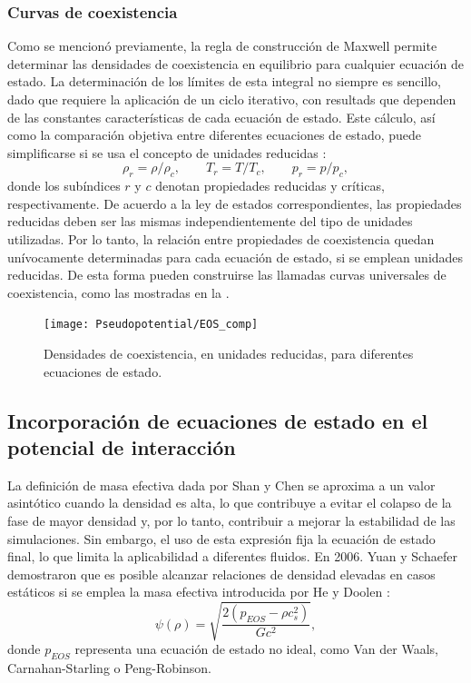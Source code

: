 

\subsubsection*{Curvas de coexistencia}

Como se mencion\'o previamente, la regla de construcci\'on de Maxwell permite determinar las densidades de coexistencia en equilibrio para cualquier ecuaci\'on de estado. La determinaci\'on de los l\'imites de esta integral no siempre es sencillo, dado que requiere la aplicaci\'on de un ciclo iterativo, con resultads que dependen de las constantes caracter\'isticas de cada ecuaci\'on de estado. Este c\'alculo, as\'i como la comparaci\'on objetiva entre diferentes ecuaciones de estado, puede simplificarse si se usa el concepto de unidades reducidas \cite{mcquarrie_molecular_1999}:
\begin{equation}
	\rho_r = \rho / \rho_c, \qquad T_r = T / T_c, \qquad p_r = p / p_c,
\end{equation}
donde los sub\'indices $r$ y $c$ denotan propiedades reducidas y cr\'iticas, respectivamente. De acuerdo a la ley de estados correspondientes, las propiedades reducidas deben ser las mismas independientemente del tipo de unidades utilizadas. Por lo tanto, la relaci\'on entre propiedades de coexistencia quedan un\'ivocamente determinadas para cada ecuaci\'on de estado, si se emplean unidades reducidas. De esta forma pueden construirse las llamadas curvas universales de coexistencia, como las mostradas en la .

\begin{figure}[ht]
	\centering
	\texttt{[image: Pseudopotential/EOS\_comp]}
	\caption{Densidades de coexistencia, en unidades reducidas, para diferentes ecuaciones de estado.}
	\label{fig:EOS}
\end{figure}





\subsection{Incorporaci\'on de ecuaciones de estado en el potencial de interacci\'on}

La definici\'on de masa efectiva dada por Shan y Chen se aproxima a un valor asint\'otico cuando la densidad es alta, lo que contribuye a evitar el colapso de la fase de mayor densidad y, por lo tanto, contribuir a mejorar la estabilidad de las simulaciones. Sin embargo, el uso de esta expresi\'on fija la ecuaci\'on de estado final, lo que limita la aplicabilidad a diferentes fluidos. En 2006. Yuan y Schaefer \cite{yuan_equations_2006} demostraron que es posible alcanzar relaciones de densidad elevadas en casos est\'aticos si se emplea la masa efectiva introducida por He y Doolen \cite{he_thermodynamic_2002}:
\begin{equation}
	\psi(\rho) = \sqrt{\dfrac{2(p_{EOS} - \rho c_s^2)}{Gc^2}},
	\label{eq:potencial}
\end{equation}
donde $p_{EOS}$ representa una ecuaci\'on de estado no ideal, como Van der Waals, Carnahan-Starling o Peng-Robinson.


